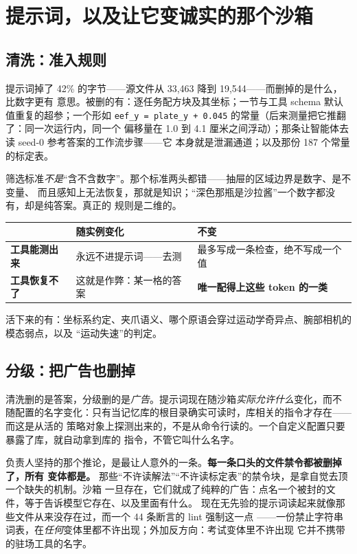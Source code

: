 \documentclass[11pt,a4paper,UTF8,fontset=macnew]{ctexrep}
\newcommand{\keyrule}[1]{\textbf{\textcolor{acc}{#1}}}
\begin{document}
\chapter{提示词，以及让它变诚实的那个沙箱}
\label{ch:sandbox}

\section{清洗：准入规则}

提示词掉了 42\% 的字节——源文件从 33{,}463 降到 19{,}544——而删掉的是什么，比数字更有
意思。被删的有：逐任务配方块及其坐标；一节与工具 schema 默认值重复的超参；一个形如
\texttt{eef\_y = plate\_y + 0.045} 的常量（后来测量把它推翻了：同一次运行内，同一个
偏移量在 1.0 到 4.1 厘米之间浮动）；那条让智能体去读 seed-0 参考答案的工作流步骤——它
本身就是泄漏通道；以及那份 187 个常量的标定表。

筛选标准\emph{不是}“含不含数字”。那个标准两头都错——抽屉的区域边界是数字、是不变量、
而且感知上无法恢复，那就是知识；“深色那瓶是沙拉酱”一个数字都没有，却是纯答案。真正的
规则是二维的。

\begin{table}[htbp]
\centering\small
\begin{tabularx}{0.94\textwidth}{@{}l X X@{}}
\toprule
 & \textbf{随实例变化} & \textbf{不变} \\
\midrule
\textbf{工具能测出来} & 永远不进提示词——去测 & 最多写成一条检查，绝不写成一个值 \\
\textbf{工具恢复不了} & 这就是作弊：某一格的答案 & \textbf{唯一配得上这些 token 的一类} \\
\bottomrule
\end{tabularx}
\end{table}

\noindent
活下来的有：坐标系约定、夹爪语义、哪个原语会穿过运动学奇异点、腕部相机的模态弱点，以及
“运动失速”的判定。

\section{分级：把广告也删掉}

清洗删的是答案，分级删的是\emph{广告}。提示词现在随沙箱\emph{实际允许什么}变化，而不
随配置的名字变化：只有当记忆库的根目录确实可读时，库相关的指令才存在——而这是从活的
策略对象上探测出来的，不是从命令行读的。一个自定义配置只要暴露了库，就自动拿到库的
指令，不管它叫什么名字。

负责人坚持的那个推论，是最让人意外的一条。\keyrule{每一条口头的文件禁令都被删掉了，所有
变体都是。} 那些“不许读解法”“不许读标定表”的禁令块，是拿自觉去顶一个缺失的机制。沙箱
一旦存在，它们就成了纯粹的广告：点名一个被封的文件，等于告诉模型它存在、以及里面有什么。
现在无先验的提示词读起来就像那些文件从来没存在过，而一个 44 条断言的 lint 强制这一点
——一份禁止字符串词表，在\emph{任何}变体里都不许出现；外加反方向：考试变体里不许出现
它并不携带的驻场工具的名字。
\end{document}
